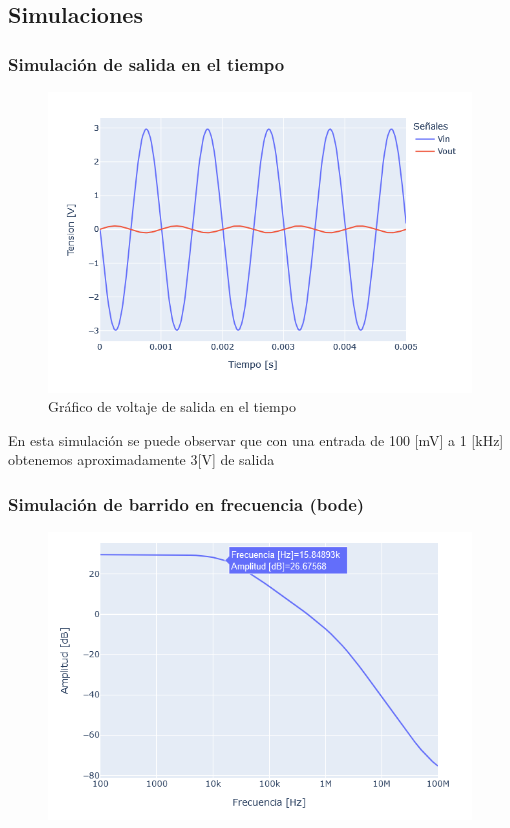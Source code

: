 \newpage
\subsection{Simulaciones}

\subsubsection{Simulación de salida en el tiempo}
 
\begin{figure}[h!]
    \centering
    \includegraphics[width=0.80\linewidth]{img/TP2_1_grafico_tiempo.png}
    \caption{Gráfico de voltaje de salida en el tiempo}
    \label{fig:1a_tiempo}
\end{figure}

En esta simulación se puede observar que con una entrada de 100 [mV] a 1 [kHz] obtenemos aproximadamente 3[V] de salida


\subsubsection{Simulación de barrido en frecuencia (bode)}

\begin{figure}[h!]
    \centering
    \includegraphics[width=0.80\linewidth]{img/TP2_1_grafico_bode_amp.png}
\end{figure}

